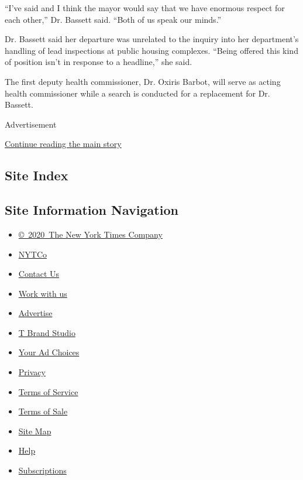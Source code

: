 ``I've said and I think the mayor would say that we have enormous
respect for each other,'' Dr. Bassett said. ``Both of us speak our
minds.''

Dr. Bassett said her departure was unrelated to the inquiry into her
department's handling of lead inspections at public housing complexes.
``Being offered this kind of position isn't in response to a headline,''
she said.

The first deputy health commissioner, Dr. Oxiris Barbot, will serve as
acting health commissioner while a search is conducted for a replacement
for Dr. Bassett.

Advertisement

\protect\hyperlink{after-bottom}{Continue reading the main story}

\hypertarget{site-index}{%
\subsection{Site Index}\label{site-index}}

\hypertarget{site-information-navigation}{%
\subsection{Site Information
Navigation}\label{site-information-navigation}}

\begin{itemize}
\tightlist
\item
  \href{https://help.nytimes.com/hc/en-us/articles/115014792127-Copyright-notice}{©~2020~The
  New York Times Company}
\end{itemize}

\begin{itemize}
\tightlist
\item
  \href{https://www.nytco.com/}{NYTCo}
\item
  \href{https://help.nytimes.com/hc/en-us/articles/115015385887-Contact-Us}{Contact
  Us}
\item
  \href{https://www.nytco.com/careers/}{Work with us}
\item
  \href{https://nytmediakit.com/}{Advertise}
\item
  \href{http://www.tbrandstudio.com/}{T Brand Studio}
\item
  \href{https://www.nytimes.com/privacy/cookie-policy\#how-do-i-manage-trackers}{Your
  Ad Choices}
\item
  \href{https://www.nytimes.com/privacy}{Privacy}
\item
  \href{https://help.nytimes.com/hc/en-us/articles/115014893428-Terms-of-service}{Terms
  of Service}
\item
  \href{https://help.nytimes.com/hc/en-us/articles/115014893968-Terms-of-sale}{Terms
  of Sale}
\item
  \href{https://spiderbites.nytimes.com}{Site Map}
\item
  \href{https://help.nytimes.com/hc/en-us}{Help}
\item
  \href{https://www.nytimes.com/subscription?campaignId=37WXW}{Subscriptions}
\end{itemize}

